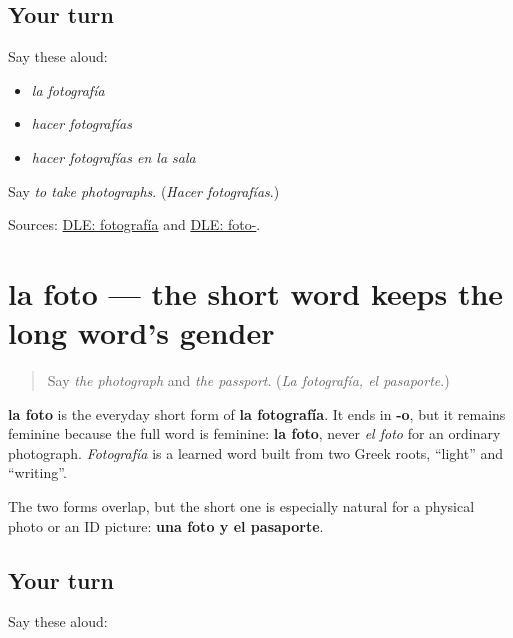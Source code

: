 \subsection*{Your turn}
Say these aloud:

\begin{itemize}
\raggedright
  \item \emph{la fotografía}
  \item \emph{hacer fotografías}
  \item \emph{hacer fotografías en la sala}
\end{itemize}

\begin{tcolorbox}[breakable,colback=teal!4,colframe=teal!35!black,title={Before you move on}]
Say \emph{to take photographs}. (\emph{Hacer fotografías}.)

Sources: \href{https://dle.rae.es/fotograf\%C3\%ADa}{DLE: fotografía} and \href{https://dle.rae.es/foto-}{DLE: foto-}.
\end{tcolorbox}
\section[la foto]{la foto — the short word keeps the long word's gender}

\label{lesson:ES-C405-foto}



\begin{quote}
Say \emph{the photograph} and \emph{the passport}. (\emph{La fotografía, el pasaporte}.)
\end{quote}

\begin{cousinweb}
\textbf{la foto} is the everyday short form of \textbf{la fotografía}. It ends in \textbf{-o}, but it remains feminine because the full word is feminine: \textbf{la foto}, never \emph{el foto} for an ordinary photograph. \emph{Fotografía} is a learned word built from two Greek roots, \textquotedblleft{}light\textquotedblright{} and \textquotedblleft{}writing\textquotedblright{}.

The two forms overlap, but the short one is especially natural for a physical photo or an ID picture: \textbf{una foto y el pasaporte}.
\end{cousinweb}

\subsection*{Your turn}
Say these aloud:

